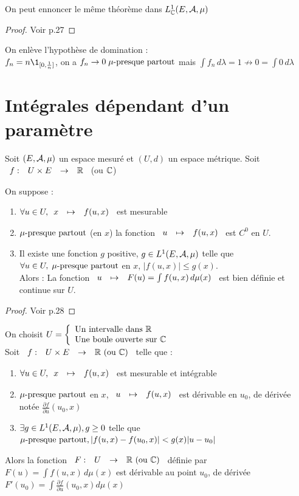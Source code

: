 \documentclass[]{report}
\begin{document}
\begin{re}
    On peut ennoncer le même théorème dans $L_{\mathbb{C}}^1(E,\mathcal{A},\mu)$
\end{re}

\begin{proof}
    Voir p.27
\end{proof}

\begin{ex}
    On enlève l'hypothèse de domination : \\
    $f_n=n\1_{[0,\frac{1}{n}]}$, on a $f_n\to0\;\mu\text{-presque partout}$ mais $\int f_n \,d\lambda=1\nrightarrow0=\int 0\,d\lambda$
\end{ex}

\section{Intégrales dépendant d'un paramètre}

Soit $(E,\mathcal{A},\mu)$ un espace mesuré et $(U,d)$ un espace métrique. Soit $\begin{array}{ccccc} f : & U\times E & \to & \mathbb{R} \end{array}$ (ou $\mathbb{C}$) 

\begin{tm}
    On suppose :
    \begin{enumerate}
        \item $\forall u\in U, \begin{array}{ccccc} x & \mapsto & f(u,x) \end{array}$ est mesurable
        \item $\mu\text{-presque partout}$ (en $x$) la fonction $\begin{array}{ccccc} u & \mapsto & f(u,x) \end{array}$ est $C^0$ en $U$.
        \item Il existe une fonction $g$ positive, $g\in L^1(E,\mathcal{A},\mu)$ telle que $\forall u\in U,\; \mu\text{-presque partout}$ en $x$, $|f(u,x)|\le g(x)$.\\
        Alors : La fonction $\begin{array}{ccccc} u & \mapsto & F(u)=\int f(u,x)\,d\mu(x) \end{array}$ est bien définie et continue sur $U$.
    \end{enumerate}
\end{tm}

\begin{proof}
    Voir p.28
\end{proof}

\begin{tm}
    On choisit $U=\left\{\begin{array}{ll} \text{Un intervalle dans }\mathbb{R}\\\text{Une boule ouverte sur }\mathbb{C} \end{array} \right.$\\
    Soit $\begin{array}{ccccc} f : & U\times E & \to & \mathbb{R}\text{ (ou }\mathbb{C}\text{)} \end{array}$ telle que :\\
    \begin{enumerate}
        \item $\forall u \in U, \begin{array}{ccccc} x & \mapsto & f(u,x) \end{array}$ est mesurable et intégrable
        \item $\mu\text{-presque partout}$ en $x$, $\begin{array}{ccccc} u & \mapsto & f(u,x) \end{array}$ est dérivable en $u_0$, de dérivée notée $\frac{\partial f}{\partial u}(u_0,x)$
        \item $\exists g\in L^1(E,\mathcal{A},\mu),g\ge0$ telle que $\mu\text{-presque partout},|f(u,x)-f(u_0,x)|<g(x)|u-u_0|$
    \end{enumerate}
    Alors la fonction $\begin{array}{ccccc} F : & U & \to & \mathbb{R}\text{ (ou }\mathbb{C}) \end{array}$ définie par $F(u)=\int f(u,x)\,d\mu(x)$ est dérivable au point $u_0$, de dérivée $F'(u_0)=\int\frac{\partial f}{\partial u}(u_0,x)d\mu(x)$
\end{tm}
\end{document}
